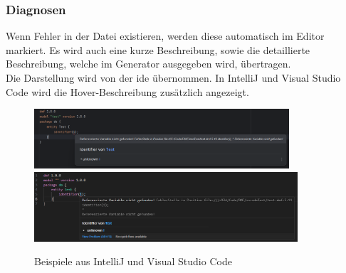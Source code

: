 \documentclass[./einleitung.tex]{subfiles}
\begin{document}
    \subsubsection{Diagnosen}\label{subsubsec:useDiagnosen}
    Wenn Fehler in der Datei existieren, werden diese automatisch im Editor markiert.
    Es wird auch eine kurze Beschreibung, sowie die detaillierte Beschreibung, welche im Generator ausgegeben wird, übertragen.\\
    Die Darstellung wird von der \acrshort{ide} übernommen.
    In IntelliJ und Visual Studio Code wird die Hover-Beschreibung zusätzlich angezeigt.\\
    \begin{figure}[H]
        \centering
        \vspace{-1.5em}
        \includegraphics[keepaspectratio,height=6em]{bilder/markierung-fehler-intellij}
        \includegraphics[keepaspectratio,height=7em]{bilder/markierung-fehler-vscode}
        \caption{Beispiele aus IntelliJ und Visual Studio Code}
        \label{fig:markierung-fehler-intellij}
        \vspace{-2em}
    \end{figure}
\end{document}
